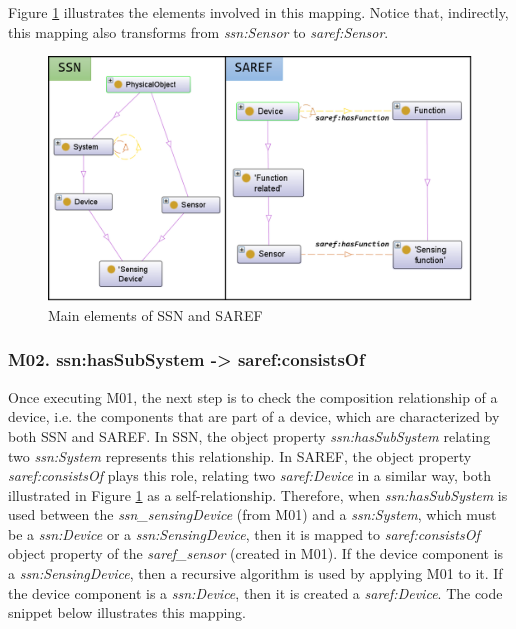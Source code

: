\documentclass{sig-alternate-05-2015}
\begin{document}
Figure \ref{fig:SSN_SAREF_SensingDevice_Device} illustrates the elements involved in this mapping. Notice that, indirectly, this mapping also transforms from \textit{ssn:Sensor} to \textit{saref:Sensor}.

\begin{figure}[h!]
\centering
\includegraphics[scale=0.28]{SSN_SAREF_SensingDevice_Device}
\caption{Main elements of SSN and SAREF}
\label{fig:SSN_SAREF_SensingDevice_Device}
\end{figure}

\subsubsection{M02. ssn:hasSubSystem -> saref:consistsOf}
Once executing M01, the next step is to check the composition relationship of a device, i.e. the components that are part of a device, which are characterized by both SSN and SAREF. In SSN, the object property \textit{ssn:hasSubSystem} relating two \textit{ssn:System} represents this relationship. In SAREF, the object property \textit{saref:consistsOf} plays this role, relating two \textit{saref:Device} in a similar way, both illustrated in Figure \ref{fig:SSN_SAREF_SensingDevice_Device} as a self-relationship. Therefore, when \textit{ssn:hasSubSystem} is used between the \textit{ssn\_sensingDevice} (from M01) and a \textit{ssn:System}, which must be a \textit{ssn:Device} or a \textit{ssn:SensingDevice}, then it is mapped to \textit{saref:consistsOf} object property of the \textit{saref\_sensor} (created in M01). If the device component is a \textit{ssn:SensingDevice}, then a recursive algorithm is used by applying M01 to it. If the device component is a \textit{ssn:Device}, then it is created a \textit{saref:Device}. The code snippet below illustrates this mapping.
\end{document}

